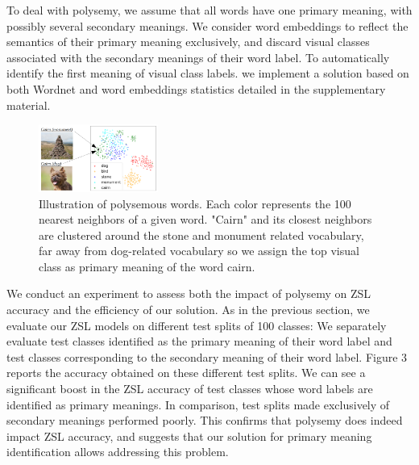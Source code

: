 To deal with polysemy, we assume that all words have one primary meaning, with possibly several secondary meanings.
We consider word embeddings to reflect the semantics of their primary meaning exclusively, and discard visual classes associated with the secondary meanings of their word label.
To automatically identify the first meaning of visual class labels.
we implement a solution based on both Wordnet and word embeddings statistics detailed in the supplementary material.

\begin{figure}[h]
\centering
\includegraphics[width=0.35\textwidth]{Figure_4.png}
\caption{
Illustration of polysemous words.
Each color represents the 100 nearest neighbors of a given word.
"Cairn" and its closest neighbors are clustered around the stone and monument related vocabulary, 
far away from dog-related vocabulary so we assign the top visual class as primary meaning of the word cairn.%
}
\end{figure}

We conduct an experiment to assess both the impact of polysemy on ZSL accuracy and the efficiency of our solution.
As in the previous section, we evaluate our ZSL models on different test splits of 100 classes:
We separately evaluate test classes identified as the primary meaning of their word label and 
test classes corresponding to the secondary meaning of their word label.
Figure 3 reports the accuracy obtained on these different test splits. 
We can see a significant boost in the ZSL accuracy of test classes whose word labels are identified as primary meanings.
In comparison, test splits made exclusively of secondary meanings performed poorly. 
This confirms that polysemy does indeed impact ZSL accuracy,
and suggests that our solution for primary meaning identification allows addressing this problem.

